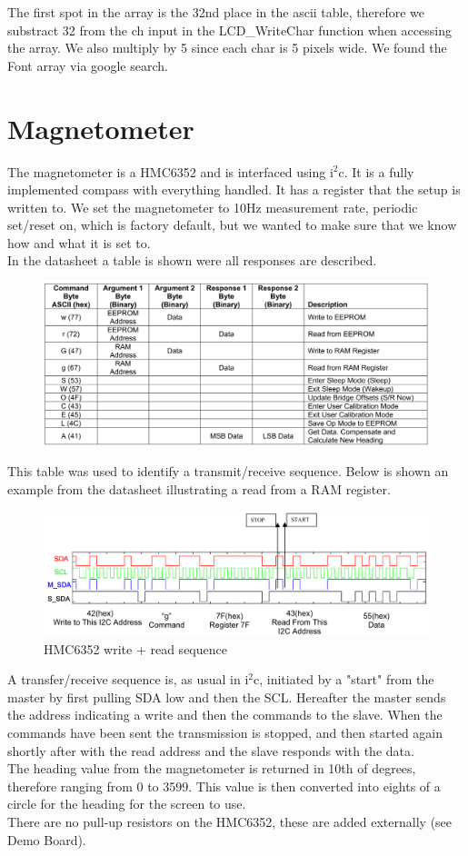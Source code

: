 The first spot in the array is the 32nd place in the ascii table, therefore we substract 32 from the ch input in the LCD\_WriteChar function when accessing the array. We also multiply by 5 since each char is 5 pixels wide. We found the Font array via google search.

\section{Magnetometer}
The magnetometer is a HMC6352 and is interfaced using i$^2$c. It is a fully implemented compass with everything handled. It has a register that  the setup is written to. We set the magnetometer to 10Hz measurement rate, periodic set/reset on, which is factory default, but we wanted to make sure that we know how and what it is set to.\\
In the datasheet a table is shown were all responses are described.

\begin{figure}[H]
\centering
\includegraphics[width=.9\textwidth]{billeder/HMC6352_responses}
\end{figure}

This table was used to identify a transmit/receive sequence. Below is shown an example from the datasheet illustrating a read from a RAM register.

\begin{figure}[H]
\centering
\includegraphics[width=.8\textwidth]{billeder/HMC6352_example}
\caption{HMC6352 write + read sequence}
\end{figure}

A transfer/receive sequence is, as usual in i$^2$c, initiated by a "start" from the master by first pulling SDA low and then the SCL. Hereafter the master sends the address indicating a write and then the commands to the slave. When the commands have been sent the transmission is stopped, and then started again shortly after with the read address and the slave responds with the data.\\
The heading value from the magnetometer is returned in 10th of degrees, therefore ranging from 0 to 3599. This value is then converted into eights of a circle for the heading for the screen to use.\\
There are no pull-up resistors on the HMC6352, these are added externally (see Demo Board).\\

